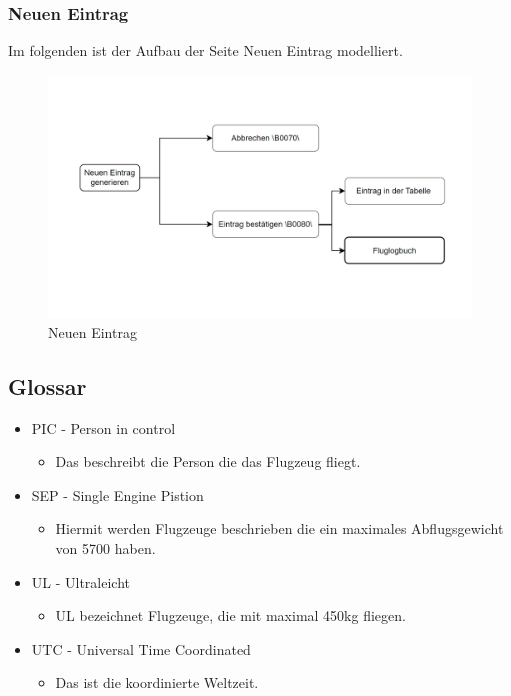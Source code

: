 \documentclass[a4paper]{article} %
\begin{document}
    \subsubsection{Neuen Eintrag}
    \vspace{0.5cm}
    Im folgenden ist der Aufbau der Seite \glqq{}Neuen Eintrag\grqq{} modelliert.
    \begin{figure}[h!]
        \centering
        \includegraphics{Benutzeroberflaeche_Neuer_Eintrag.png}
        \caption{Neuen Eintrag}
        \label{fig:my_label}
    \end{figure}
    \vspace{0.5cm}

    \subsection{Glossar}
    \vspace{1cm}
    \begin{itemize}
    \item PIC - Person in control
    \begin{itemize}
        \item Das beschreibt die Person die das Flugzeug fliegt.
    \end{itemize}
    \item SEP - Single Engine Pistion
    \begin{itemize}
        \item Hiermit werden Flugzeuge beschrieben die ein maximales Abflugsgewicht von 5700 haben.
    \end{itemize}
    \item UL  - Ultraleicht 
    \begin{itemize}
        \item UL bezeichnet Flugzeuge, die mit maximal 450kg fliegen.
    \end{itemize}
    \item UTC - Universal Time Coordinated
    \begin{itemize}
        \item Das ist die koordinierte Weltzeit.
    \end{itemize}
    \end{itemize}
    
\end{document}
